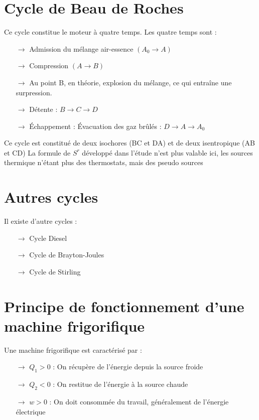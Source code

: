 \section{Cycle de Beau de Roches}
\begin{de}
 Ce cycle constitue le moteur à quatre temps. Les quatre temps sont : 
\begin{itemize}
 \item[$\rightarrow$]Admission du mélange air-essence $(A_0 \rightarrow A)$
 \item[$\rightarrow$]Compression $(A \rightarrow B)$
 \item[$\rightarrow$]Au point B, en théorie, explosion du mélange, ce qui entraîne une surpression.
 \item[$\rightarrow$]Détente : $B\rightarrow C\rightarrow D$
 \item[$\rightarrow$]Échappement : Évacuation des gaz brûlés : $D\rightarrow A \rightarrow A_0$
\end{itemize}
Ce cycle est constitué de deux isochores (BC et DA) et de deux isentropique (AB et CD)
La formule de $S^r$ développé dans l'étude n'est plus valable ici, les sources thermique n'étant plus des thermostats, mais des pseudo sources
\end{de}
\section{Autres cycles}
Il existe d'autre cycles : 
\begin{itemize}
 \item[$\rightarrow$] Cycle Diesel
 \item[$\rightarrow$] Cycle de Brayton-Joules
 \item[$\rightarrow$] Cycle de Stirling
\end{itemize}
\section{Principe de fonctionnement d'une machine frigorifique}
Une machine frigorifique est caractérisé par :
\begin{itemize}
 \item[$\rightarrow$] $Q_1 > 0$ : On récupère de l'énergie depuis la source froide
 \item[$\rightarrow$] $Q_2 < 0$ : On restitue de l'énergie à la source chaude
 \item[$\rightarrow$] $w > 0$ : On doit consommée du travail, généralement de l'énergie électrique
\end{itemize}
